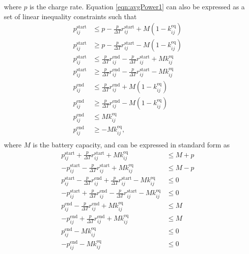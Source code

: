 where $p$ is the charge rate. Equation \eqref{eqn:avgPower1} can also be expressed as a set of linear inequality constraints such that
\begin{equation} \begin{aligned}
	p_{ij}^{\text{start}} &\le p - \frac{p}{\Delta T}r_{ij}^{\text{start}} + M\left ( 1 - k_{ij}^{\text{eq}} \right ) \\
	p_{ij}^{\text{start}} &\ge p - \frac{p}{\Delta T}r_{ij}^{\text{start}} - M\left ( 1 - k_{ij}^{\text{eq}} \right ) \\ 
	p_{ij}^{\text{start}} &\le \frac{p}{\Delta T}r_{ij}^{\text{end}} - \frac{p}{\Delta T}r_{ij}^{\text{start}} + Mk_{ij}^{\text{eq}}\\
	p_{ij}^{\text{start}} &\ge \frac{p}{\Delta T}r_{ij}^{\text{end}} - \frac{p}{\Delta T}r_{ij}^{\text{start}} - Mk_{ij}^{\text{eq}}\\ 
	p_{ij}^{\text{end}}   &\le \frac{p}{\Delta T}r_{ij}^{\text{end}} + M\left ( 1 - k_{ij}^{\text{eq}} \right )\\
	p_{ij}^{\text{end}}   &\ge \frac{p}{\Delta T}r_{ij}^{\text{end}} - M\left ( 1 - k_{ij}^{\text{eq}} \right )\\
	p_{ij}^{\text{end}}   &\le Mk_{ij}^{\text{eq}}\\
	p_{ij}^{\text{end}}   &\ge - Mk_{ij}^{\text{eq}},\\
\end{aligned} \end{equation}
where $M$ is the battery capacity, and can be expressed in standard form as
\begin{equation} \begin{aligned}
	 p_{ij}^{\text{start}} + \frac{p}{\Delta T} r_{ij}^{\text{start}} + Mk_{ij}^{\text{eq}} &\le M + p \\
	-p_{ij}^{\text{start}} - \frac{p}{\Delta T} r_{ij}^{\text{start}} + Mk_{ij}^{\text{eq}} &\le M - p \\
	 p_{ij}^{\text{start}} - \frac{p}{\Delta T} r_{ij}^{\text{end}}  + \frac{p}{\Delta T}r_{ij}^{\text{start}} - Mk_{ij}^{\text{eq}} &\le 0\\
	-p_{ij}^{\text{start}} + \frac{p}{\Delta T} r_{ij}^{\text{end}}  - \frac{p}{\Delta T}r_{ij}^{\text{start}} - Mk_{ij}^{\text{eq}} &\le 0\\
	 p_{ij}^{\text{end}}   - \frac{p}{\Delta T} r_{ij}^{\text{end}} + Mk_{ij}^{\text{eq}} &\le M \\
	-p_{ij}^{\text{end}}   + \frac{p}{\Delta T} r_{ij}^{\text{end}} + Mk_{ij}^{\text{eq}} &\le M \\
	 p_{ij}^{\text{end}}   - Mk_{ij}^{\text{eq}} &\le 0\\
	-p_{ij}^{\text{end}}   - Mk_{ij}^{\text{eq}}&\le 0 \\
\end{aligned} \end{equation}

